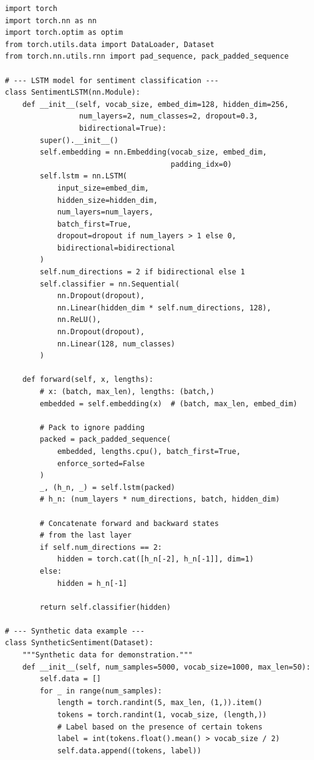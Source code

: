\begin{codeblock}[title=\textbf{Sequence classification with bidirectional LSTM}]
\begin{verbatim}
import torch
import torch.nn as nn
import torch.optim as optim
from torch.utils.data import DataLoader, Dataset
from torch.nn.utils.rnn import pad_sequence, pack_padded_sequence

# --- LSTM model for sentiment classification ---
class SentimentLSTM(nn.Module):
    def __init__(self, vocab_size, embed_dim=128, hidden_dim=256,
                 num_layers=2, num_classes=2, dropout=0.3,
                 bidirectional=True):
        super().__init__()
        self.embedding = nn.Embedding(vocab_size, embed_dim,
                                      padding_idx=0)
        self.lstm = nn.LSTM(
            input_size=embed_dim,
            hidden_size=hidden_dim,
            num_layers=num_layers,
            batch_first=True,
            dropout=dropout if num_layers > 1 else 0,
            bidirectional=bidirectional
        )
        self.num_directions = 2 if bidirectional else 1
        self.classifier = nn.Sequential(
            nn.Dropout(dropout),
            nn.Linear(hidden_dim * self.num_directions, 128),
            nn.ReLU(),
            nn.Dropout(dropout),
            nn.Linear(128, num_classes)
        )

    def forward(self, x, lengths):
        # x: (batch, max_len), lengths: (batch,)
        embedded = self.embedding(x)  # (batch, max_len, embed_dim)

        # Pack to ignore padding
        packed = pack_padded_sequence(
            embedded, lengths.cpu(), batch_first=True,
            enforce_sorted=False
        )
        _, (h_n, _) = self.lstm(packed)
        # h_n: (num_layers * num_directions, batch, hidden_dim)

        # Concatenate forward and backward states
        # from the last layer
        if self.num_directions == 2:
            hidden = torch.cat([h_n[-2], h_n[-1]], dim=1)
        else:
            hidden = h_n[-1]

        return self.classifier(hidden)

# --- Synthetic data example ---
class SyntheticSentiment(Dataset):
    """Synthetic data for demonstration."""
    def __init__(self, num_samples=5000, vocab_size=1000, max_len=50):
        self.data = []
        for _ in range(num_samples):
            length = torch.randint(5, max_len, (1,)).item()
            tokens = torch.randint(1, vocab_size, (length,))
            # Label based on the presence of certain tokens
            label = int(tokens.float().mean() > vocab_size / 2)
            self.data.append((tokens, label))


\end{verbatim}
\end{codeblock}
